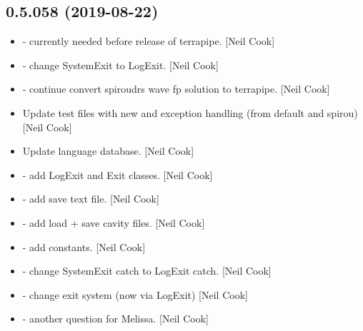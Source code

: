 \documentclass[a4paper,10pt,english]{report}
\begin{document}
\subsection{0.5.058 (2019-08-22)}
\label{\detokenize{misc/changelog:id85}}\begin{itemize}
\item {} 
 - currently needed before release of terrapipe. {[}Neil
Cook{]}

\item {} 
 - change SystemExit to LogExit.
{[}Neil Cook{]}

\item {} 
 - continue convert spiroudrs wave fp solution to
terrapipe. {[}Neil Cook{]}

\item {} 
Update test files with new  and exception handling (from
default and spirou) {[}Neil Cook{]}

\item {} 
Update language database. {[}Neil Cook{]}

\item {} 
 - add LogExit and Exit classes. {[}Neil Cook{]}

\item {} 
 - add save text file. {[}Neil Cook{]}

\item {} 
 - add load + save cavity files. {[}Neil Cook{]}

\item {} 
 - add  constants. {[}Neil Cook{]}

\item {} 
 - change SystemExit catch to LogExit catch.
{[}Neil Cook{]}

\item {} 
 - change exit system (now via LogExit) {[}Neil
Cook{]}

\item {} 
 - another question for Melissa. {[}Neil Cook{]}

\end{itemize}
\end{document}
